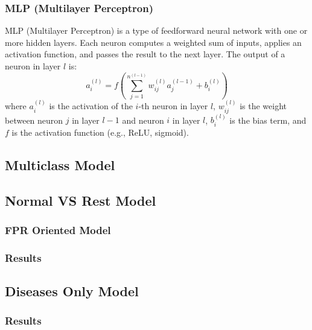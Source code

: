 \subsubsection{MLP (Multilayer Perceptron)}
MLP (Multilayer Perceptron) is a type of feedforward neural network with one or more hidden layers. Each neuron computes a weighted sum of inputs, applies an activation function, and passes the result to the next layer. The output of a neuron in layer $l$ is:
\begin{equation*}
a_i^{(l)} = f \left( \sum_{j=1}^{n^{(l-1)}} w_{ij}^{(l)} a_j^{(l-1)} + b_i^{(l)} \right)
\end{equation*}
where $a_i^{(l)}$ is the activation of the $i$-th neuron in layer $l$, $w_{ij}^{(l)}$ is the weight between neuron $j$ in layer $l-1$ and neuron $i$ in layer $l$, $b_i^{(l)}$ is the bias term, and $f$ is the activation function (e.g., ReLU, sigmoid).





\subsection{Multiclass Model}

\subsection{Normal VS Rest Model}
\subsubsection{FPR Oriented Model}
\subsubsection{Results}

\subsection{Diseases Only Model}
\subsubsection{Results}